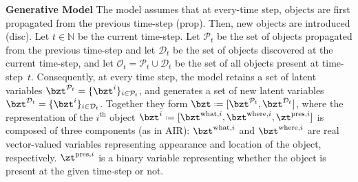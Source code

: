 \textbf{Generative Model}
The model assumes that at every-time step, objects are first propagated from the previous time-step (\gls{prop}). Then, new objects are introduced (\gls{disc}). 
Let $t \in \mathbb{N}$ be the current time-step.
Let $\mathcal{P}_t$ be the set of objects propagated from the previous time-step and let $\mathcal{D}_t$ be the set of objects discovered at the current time-step, and let $\mathcal{O}_t = \mathcal{P}_t \cup \mathcal{D}_t$ be the set of all objects present at time-step~$t$.
Consequently, at every time step, the model retains a set of latent variables $\bzt^{\mathcal{P}_t} = \{ \bzt^i \}_{i \in \mathcal{P}_t}$, and generates a set of new latent variables $\bzt^{\mathcal{D}_t} = \{ \bzt^i \}_{i \in \mathcal{D}_t}$. Together they form $\bzt \defeq [\bzt^{\mathcal{P}_t}, \bzt^{\mathcal{D}_t}]$, where the representation of the $i^\mathrm{th}$ object $\bzt^i \defeq [ \bzt^{\mathrm{what}, i}, \bzt^{\mathrm{where}, i}, \zt^{\mathrm{pres}, i}]$ is composed of three components (as in \gls{AIR}): 
$\bzt^{\mathrm{what},i}$ and $\bzt^{\mathrm{where},i}$ are real vector-valued variables representing appearance and location of the object, respectively. $\zt^{\mathrm{pres},i}$ is a binary variable representing whether the object is present at the given time-step or not.


